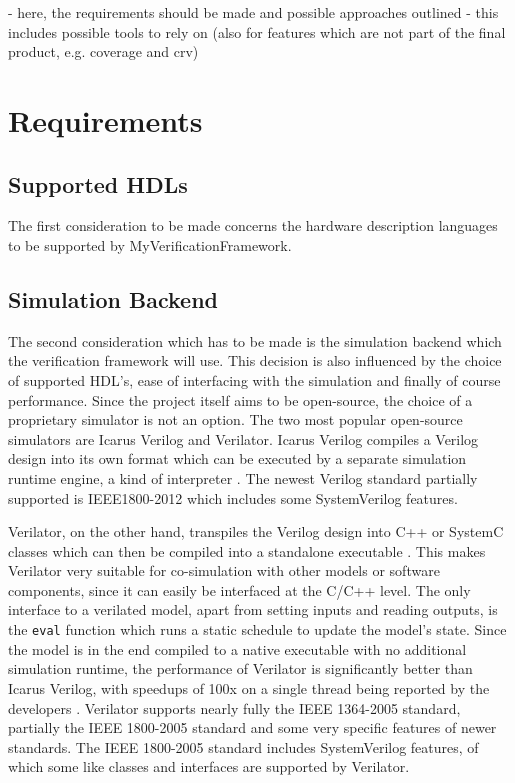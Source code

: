 \documentclass[12pt]{book}
\newcommand{\name}{MyVerificationFramework}
\begin{document}
- here, the requirements should be made and possible approaches outlined
- this includes possible tools to rely on (also for features which are not part of the final product, e.g. coverage and crv)


\section{Requirements} %

\subsection{Supported HDLs}
The first consideration to be made concerns the hardware description languages to be supported by \name. 

\subsection{Simulation Backend}
The second consideration which has to be made is the simulation backend which the verification framework will use. This decision is also influenced by the choice of supported HDL's, ease of interfacing with the simulation and finally of course performance. Since the project itself aims to be open-source, the choice of a proprietary simulator is not an option. The two most popular open-source simulators are Icarus Verilog and Verilator. Icarus Verilog compiles a Verilog design into its own format which can be executed by a separate simulation runtime engine, a kind of interpreter \cite{iverilog}. The newest Verilog standard partially supported is IEEE1800-2012 which includes some SystemVerilog features. 

Verilator, on the other hand, transpiles the Verilog design into C++ or SystemC classes which can then be compiled into a standalone executable \cite{verilator}. This makes Verilator very suitable for co-simulation with other models or software components, since it can easily be interfaced at the C/C++ level. The only interface to a verilated model, apart from setting inputs and reading outputs, is the \texttt{eval} function which runs a static schedule to update the model's state. Since the model is in the end compiled to a native executable with no additional simulation runtime, the performance of Verilator is significantly better than Icarus Verilog, with speedups of 100x on a single thread being reported by the developers \cite{verilator}. Verilator supports nearly fully the IEEE 1364-2005 standard, partially the IEEE 1800-2005 standard and some very specific features of newer standards. The IEEE 1800-2005 standard includes SystemVerilog features, of which some like classes and interfaces are supported by Verilator.
\end{document}
